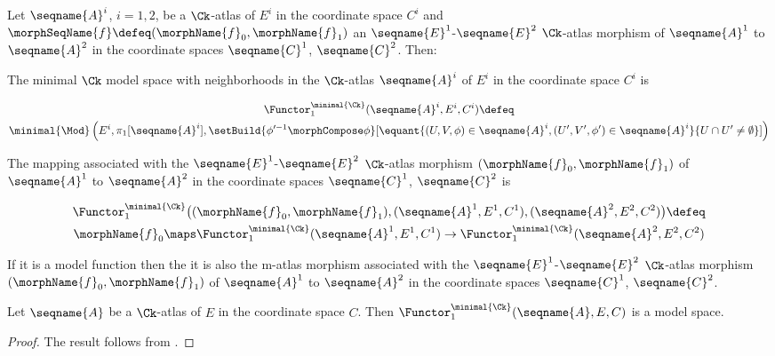 \documentclass{article}
\begin{document}
\begin{definition}
\label{def:Ck-modE}
Let $\seqname{A}^i$, $i=1,2$, be a $\Ck$-atlas of $E^i$ in the coordinate
space $C^i$ and
$\morphSeqName{f} \defeq (\morphName{f}_0, \morphName{f}_1)$ an
$\seqname{E}^1$-$\seqname{E}^2$ $\Ck$-atlas morphism of $\seqname{A}^1$
to $\seqname{A}^2$ in the coordinate spaces $\seqname{C}^1$,
$\seqname{C}^2$. Then:

The minimal $\Ck$ model space with neighborhoods
in the $\Ck$-atlas $\seqname{A}^i$ of $E^i$ in the coordinate space
$C^i$ is

\begin{multline}
\Functor^{\minimal{\Ck}}_1 (\seqname{A}^i, E^i, C^i)
\defeq \\
\minimal{\Mod}
  \left (
    E^i,
    \pi_1[\seqname{A}^i],
    \setBuild
      {\phi'^{-1} \morphCompose \phi}%
      [
        \equant
          {
            {(U,V,\phi) \in \seqname{A}^i},
            {(U',V',\phi') \in \seqname{A}^i}
          }
          {
            U \cap U' \ne \emptyset
          }
      ]
  \right )
\end{multline}

The mapping associated with the $\seqname{E}^1$-$\seqname{E}^2$
$\Ck$-atlas morphism $(\morphName{f}_0,\morphName{f}_1)$ of
$\seqname{A}^1$ to $\seqname{A}^2$ in the coordinate spaces
$\seqname{C}^1$, $\seqname{C}^2$ is

\begin{multline}
\Functor^{\minimal{\Ck}}_1
  \bigl (
    (
      \morphName{f}_0,
      \morphName{f}_1
    ),
    (\seqname{A}^1, E^1, C^1),
    (\seqname{A}^2, E^2, C^2)
  \bigr )
\defeq \\
  \morphName{f}_0
  \maps
  \Functor^{\minimal{\Ck}}_1 (\seqname{A}^1, E^1, C^1)
  \to
  \Functor^{\minimal{\Ck}}_1 (\seqname{A}^2, E^2, C^2)
\end{multline}

If it is a model function then the it is also the m-atlas morphism
associated with the $\seqname{E}^1$-$\seqname{E}^2$ $\Ck$-atlas morphism
$(\morphName{f}_0,\morphName{f}_1)$ of $\seqname{A}^1$ to $\seqname{A}^2$
in the coordinate spaces $\seqname{C}^1$, $\seqname{C}^2$.
\end{definition}

\begin{lemma}
\label{lem:Ck-ismodE}
Let $\seqname{A}$ be a $\Ck$-atlas of $E$ in the coordinate
space $C$. Then $\Functor^{\minimal{\Ck}}_1 (\seqname{A}, E, C)$ is a
model space.

\begin{proof}
The result follows from .
\end{proof}
\end{lemma}
\end{document}
